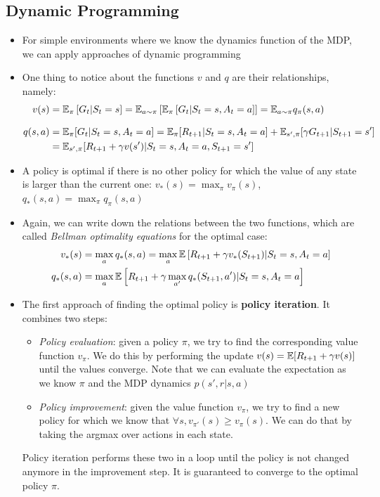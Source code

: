 \subsection{Dynamic Programming}
\begin{itemize}
	\item For simple environments where we know the dynamics function of the MDP, we can apply approaches of dynamic programming
	\item One thing to notice about the functions $v$ and $q$ are their relationships, namely:
	\begin{equation*}
		\begin{split}
			v(s) & = \mathbb{E}_{\pi}\left[G_t|S_t=s\right] = \mathbb{E}_{a\sim\pi}\left[\mathbb{E}_{\pi}\left[G_t|S_t=s,A_t=a\right]\right] = \mathbb{E}_{a\sim\pi} q_{\pi}(s,a)\\[8pt]
			q(s,a) & = \mathbb{E}_{\pi}[G_t|S_t=s,A_t=a] = \mathbb{E}_{\pi}[R_{t+1}|S_t=s,A_t=a]+\mathbb{E}_{s',\pi}[\gamma G_{t+1}|S_{t+1}=s'] \\& = \mathbb{E}_{s',\pi}[R_{t+1}+\gamma v(s')|S_t=s,A_t=a,S_{t+1}=s']
		\end{split}
	\end{equation*}
	\item A policy is optimal if there is no other policy for which the value of any state is larger than the current one: $v_{*}(s)=\max_{\pi} v_{\pi}(s)$, $q_{*}(s,a)=\max_{\pi} q_{\pi}(s,a)$
	\item Again, we can write down the relations between the two functions, which are called \textit{Bellman optimality equations} for the optimal case:
	\begin{equation*}
		\begin{split}
			v_{*}(s) & =\max_{a}q_{*}(s,a)= \max_a \mathbb{E}\left[R_{t+1}+\gamma v_{*}(S_{t+1})|S_t=s,A_t=a\right]\\
			q_{*}(s,a) & = \max_{a}\mathbb{E}\left[R_{t+1}+\gamma \max_{a'} q_{*}(S_{t+1},a')|S_t=s,A_t=a\right]
		\end{split}
	\end{equation*}
	
	\item The first approach of finding the optimal policy is \textbf{policy iteration}. It combines two steps:
	\begin{itemize}
		\item \textit{Policy evaluation}: given a policy $\pi$, we try to find the corresponding value function $v_{\pi}$. We do this by performing the update $v(s)=\mathbb{E}[R_{t+1}+\gamma v(s)]$ until the values converge. Note that we can evaluate the expectation as we know $\pi$ and the MDP dynamics $p(s',r|s,a)$
		\item \textit{Policy improvement}: given the value function $v_{\pi}$, we try to find a new policy for which we know that $\forall s, v_{\pi'}(s)\geq v_{\pi}(s)$. We can do that by taking the argmax over actions in each state.
	\end{itemize}
	Policy iteration performs these two in a loop until the policy is not changed anymore in the improvement step. It is guaranteed to converge to the optimal policy $\pi$.
	

\end{itemize}

